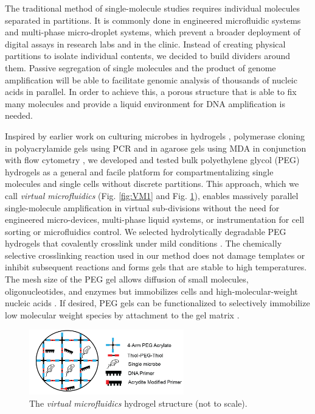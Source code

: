 The traditional method of single-molecule studies requires individual molecules separated in partitions. It is commonly done in engineered microfluidic systems and multi-phase micro-droplet systems, which prevent a broader deployment of digital assays in research labs and in the clinic. Instead of creating physical partitions to isolate individual contents, we decided to build  dividers around them. Passive segregation of single molecules and the product of genome amplification will be able to facilitate genomic analysis of thousands of nucleic acids in parallel. In order to achieve this, a porous structure that is able to fix many molecules and provide a liquid environment for DNA amplification is needed. 

Inspired by earlier work on culturing microbes in hydrogels \cite{Podar:2009ks}, polymerase cloning in polyacrylamide gels using PCR \cite{Mitra:1999ty} and in agarose gels using MDA in conjunction with flow cytometry \cite{Allen:2011jn}, we developed and tested bulk polyethylene glycol (PEG) hydrogels as a general and facile platform for compartmentalizing single molecules and single cells without discrete partitions. This approach, which we call \textit{virtual microfluidics} (Fig. \ref{fig:VM1} and Fig. \ref{fig:GelStructure}), enables massively parallel single-molecule amplification in virtual sub-divisions without the need for engineered micro-devices, multi-phase liquid systems, or instrumentation for cell sorting or microfluidics control. We selected hydrolytically degradable PEG hydrogels that covalently crosslink under mild conditions \cite{Raeber:2005cq}. The chemically selective crosslinking reaction used in our method does not damage templates or inhibit subsequent reactions and forms gels that are stable to high temperatures. The mesh size of the PEG gel allows diffusion of small molecules, oligonucleotides, and enzymes but immobilizes cells and high-molecular-weight nucleic acids \cite{Wu:2009ez}. If desired, PEG gels can be functionalized to selectively immobilize low molecular weight species by attachment to the gel matrix \cite{Phelps:2011dka}.

\begin{figure} 
\centering
\includegraphics[keepaspectratio,width=0.6\textwidth]{./figures/SolidPhaseWGA-21}
\caption[The \textit{virtual microfluidics} hydrogel structure.]{The \textit{virtual microfluidics} hydrogel structure (not to scale).}
\label{fig:GelStructure}
\end{figure}

